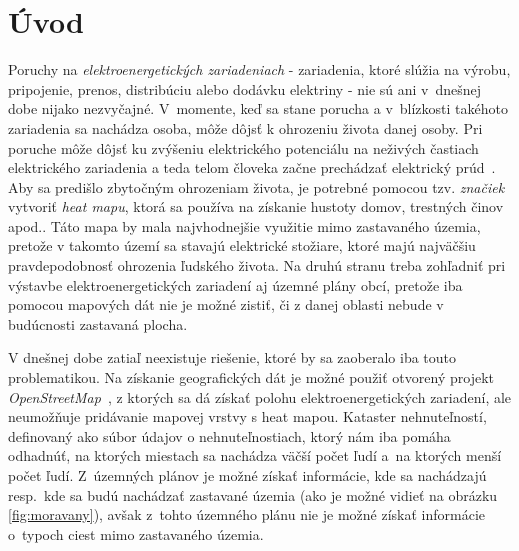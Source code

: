 \documentclass[slovak]{ExcelAtFIT} %
\affiliation{*%
  \href{mailto:xkoprd00@stud.fit.vutbr.cz}{xkoprd00@stud.fit.vutbr.cz},
  \textit{Fakulta informačních technológií, Vysoké učení technické v Brně}}
\begin{document}
\startdocument



\section{Úvod}
Poruchy na \textit{elektroenergetických zariadeniach} - zariadenia, ktoré slúžia na výrobu, pripojenie, prenos, distribúciu alebo dodávku elektriny - nie sú ani v~dnešnej dobe nijako nezvyčajné. V~momente, keď sa stane porucha a v~blízkosti takéhoto zariadenia sa nachádza osoba, môže dôjsť k ohrozeniu života danej osoby. Pri poruche môže dôjsť ku zvýšeniu elektrického potenciálu na neživých častiach elektrického zariadenia a teda telom človeka začne prechádzať elektrický prúd~\cite{Vycital-Zemnisoustavy}. Aby sa predišlo zbytočným ohrozeniam života, je potrebné pomocou tzv. \emph{značiek} vytvoriť \emph{heat mapu}, ktorá sa používa na získanie hustoty domov, trestných činov apod.\cite{DeBoer-Heatmap}. Táto mapa by mala najvhodnejšie využitie mimo zastavaného územia, pretože v takomto území sa stavajú elektrické stožiare, ktoré majú najväčšiu pravdepodobnosť ohrozenia ľudského života. Na druhú stranu treba zohľadniť pri výstavbe elektroenergetických zariadení aj územné plány obcí, pretože iba pomocou mapových dát nie je možné zistiť, či z danej oblasti nebude v budúcnosti zastavaná plocha.

V dnešnej dobe zatiaľ neexistuje riešenie, ktoré by sa zaoberalo iba touto problematikou. Na získanie geografických dát je možné použiť otvorený projekt \emph{OpenStreetMap}~\cite{Openstreet}, z ktorých sa dá získať polohu elektroenergetických zariadení, ale neumožňuje pridávanie mapovej vrstvy s heat mapou. Kataster nehnuteľností, definovaný ako súbor údajov o nehnuteľnostiach, ktorý nám iba pomáha odhadnúť, na ktorých miestach sa nachádza väčší počet ľudí a~na ktorých menší počet ľudí. Z~územných plánov je možné získať informácie, kde sa nachádzajú resp.~kde sa budú nachádzať zastavané územia (ako je možné vidieť na obrázku \ref{fig:moravany}), avšak z~tohto územného plánu nie je možné získať informácie o~typoch ciest mimo zastavaného územia.
\end{document}
